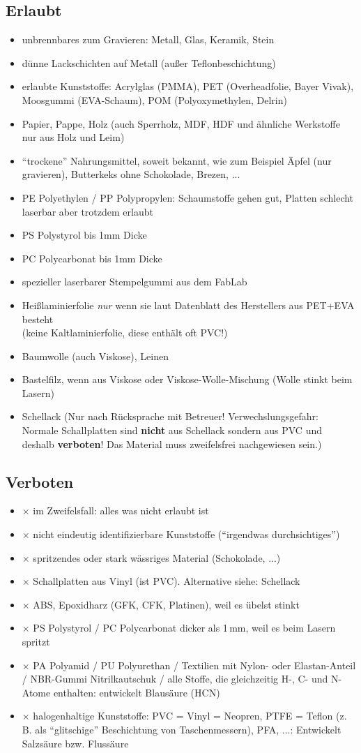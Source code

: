 \documentclass{\basedir/fablab-document}
\begin{document}
	\subsection{Erlaubt}
	\newcommand{\itemCheck}{\item[\checkmark]}
	\begin{itemize}
		\itemCheck unbrennbares zum Gravieren: Metall, Glas, Keramik, Stein
		\itemCheck dünne Lackschichten auf Metall (außer Teflonbeschichtung)
		\itemCheck erlaubte Kunststoffe: Acrylglas (PMMA), PET (Overheadfolie, Bayer Vivak), Moosgummi (EVA-Schaum), POM (Polyoxymethylen, Delrin)
		\itemCheck Papier, Pappe, Holz (auch Sperrholz, MDF, HDF und ähnliche Werkstoffe nur aus Holz und Leim)
		\itemCheck \enquote{trockene} Nahrungsmittel, soweit bekannt, wie zum Beispiel Äpfel (nur gravieren), Butterkeks ohne Schokolade, Brezen, ...
		\itemCheck PE Polyethylen / PP Polypropylen: Schaumstoffe gehen gut, Platten schlecht laserbar aber trotzdem erlaubt
		\itemCheck PS Polystyrol bis 1mm Dicke
		\itemCheck PC Polycarbonat bis 1mm Dicke
		\itemCheck spezieller laserbarer Stempelgummi aus dem FabLab
		\itemCheck Heißlaminierfolie \emph{nur} wenn sie laut Datenblatt des Herstellers aus PET+EVA besteht\\(keine Kaltlaminierfolie, diese enthält oft PVC!)
		\itemCheck Baumwolle (auch Viskose), Leinen
		\itemCheck Bastelfilz, wenn aus Viskose oder Viskose-Wolle-Mischung (Wolle stinkt beim Lasern)
		\itemCheck Schellack (Nur nach Rücksprache mit Betreuer! Verwechslungsgefahr: Normale Schallplatten sind \textbf{nicht} aus Schellack sondern aus PVC und deshalb \textbf{verboten}! Das Material muss zweifelsfrei nachgewiesen sein.)
	\end{itemize}

	\newpage %

	\subsection{Verboten}
	\newcommand{\itemCross}{\item[$\times$]}
	\begin{itemize}
		\itemCross im Zweifelsfall: alles was nicht erlaubt ist
		\itemCross nicht eindeutig identifizierbare Kunststoffe (\enquote{irgendwas durchsichtiges})
		\itemCross spritzendes oder stark wässriges Material (Schokolade, ...)
		\itemCross Schallplatten aus Vinyl (ist PVC). Alternative siehe: Schellack
		\itemCross ABS, Epoxidharz (GFK, CFK, Platinen), weil es übelst stinkt
		\itemCross PS Polystyrol / PC Polycarbonat dicker als 1\,mm, weil es beim Lasern spritzt
		\itemCross PA Polyamid / PU Polyurethan / Textilien mit Nylon- oder Elastan-Anteil / NBR-Gummi Nitrilkautschuk / alle Stoffe, die gleichzeitig H-, C- und N-Atome enthalten: entwickelt Blausäure (HCN)
		\itemCross halogenhaltige Kunststoffe: PVC = Vinyl = Neopren, PTFE = Teflon (z.\,B. als \enquote{glitschige} Beschichtung von Taschenmessern), PFA, ...: Entwickelt Salzsäure bzw. Flussäure
	\end{itemize}
\end{document}
